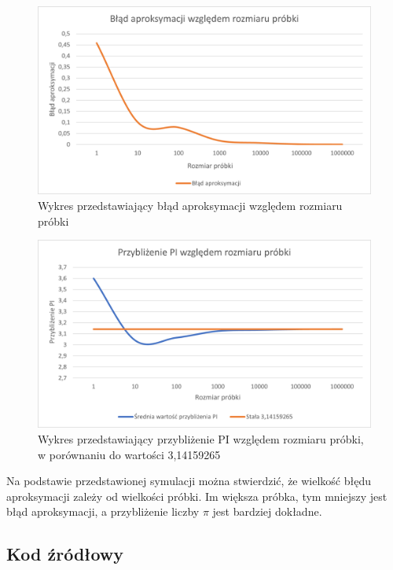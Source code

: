 \documentclass[a4paper,11pt,titlepage]{article}
\begin{document}
\begin{figure}[H]
\centering
\includegraphics[width=1\columnwidth]{img/pi-excel.PNG}
\caption{Wykres przedstawiający błąd aproksymacji względem rozmiaru próbki}
\label{fig:pie1}
\end{figure}

\begin{figure}[H]
\centering
\includegraphics[width=1\columnwidth]{img/pi-excel2.PNG}
\caption{Wykres przedstawiający przybliżenie PI względem rozmiaru próbki, w porównaniu do wartości 3,14159265}
\label{fig:pie2}
\end{figure}

Na podstawie przedstawionej symulacji można stwierdzić, że wielkość błędu aproksymacji zależy od wielkości próbki. Im większa próbka, tym mniejszy jest błąd aproksymacji, a przybliżenie liczby $\pi$ jest bardziej dokładne.

\subsection{Kod źródłowy}



\end{document}
